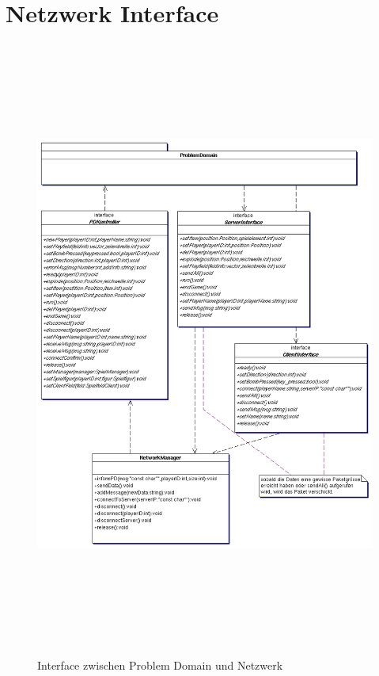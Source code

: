 \section{Netzwerk Interface}

\begin{figure}[H]
  \begin{center}
    {\includegraphics[height=20cm]{./images/netinterface.pdf}}
  \end{center}
  \caption{Interface zwischen Problem Domain und Netzwerk}
\end{figure}


